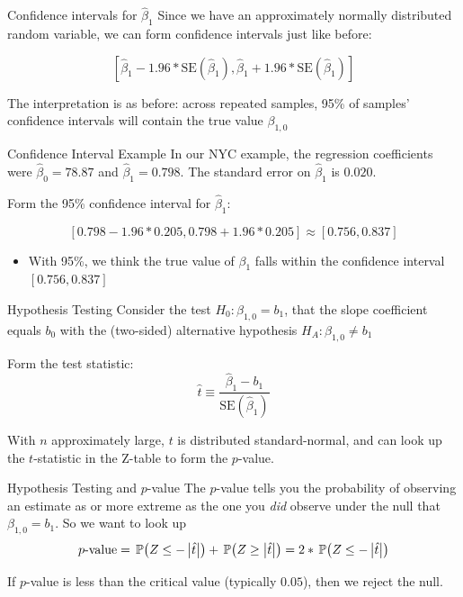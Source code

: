 \documentclass[aspectratio=169,t,11pt,table]{beamer}
\begin{document}
\begin{frame}{Confidence intervals for $\hat{\beta}_1$}
  Since we have an approximately normally distributed random variable, we can form confidence intervals just like before:

  $$
    \left[
      \hat{\beta}_1 - 1.96 * \text{SE}(\hat{\beta}_1), 
      \hat{\beta}_1 + 1.96 * \text{SE}(\hat{\beta}_1)
    \right]
  $$

  \pause
  \bigskip
  The interpretation is as before: across repeated samples, 95\% of samples' confidence intervals will contain the true value $\beta_{1, 0}$
\end{frame}

\begin{frame}{Confidence Interval Example}
  In our NYC example, the regression coefficients were $\hat{\beta}_0 = 78.87$ and $\hat{\beta}_1 = 0.798$. The standard error on $\hat{\beta}_1$ is $0.020$.

  \bigskip
  Form the 95\% confidence interval for $\hat{\beta}_1$:

  \pause
  $$
    \left[ 0.798 - 1.96 * 0.205, 0.798 + 1.96 * 0.205 \right] \approx
    \left[ 0.756, 0.837 \right]
  $$
  \begin{itemize}
    \item With 95\%, we think the true value of $\beta_1$ falls within the confidence interval $\left[ 0.756, 0.837 \right]$
  \end{itemize}
\end{frame}

\begin{frame}{Hypothesis Testing}
  Consider the test $H_0: \beta_{1, 0} = b_1$, that the slope coefficient equals $b_0$ with the (two-sided) alternative hypothesis $H_A: \beta_{1, 0} \neq b_1$

  \bigskip
  Form the \alert{test statistic}:
  $$
    \hat{t} \equiv \frac{\hat{\beta}_1 - b_1}{\text{SE}(\hat{\beta}_1)}
  $$

  With $n$ approximately large, $t$ is distributed standard-normal, and can look up the $t$-statistic in the Z-table to form the \alert{$p$-value}.
\end{frame}

\begin{frame}{Hypothesis Testing and $p$-value}
  The $p$-value tells you the probability of observing an estimate as or more extreme as the one you \emph{did} observe under the null that $\beta_{1, 0} = b_1$. So we want to look up 
  $$
    p\text{-value} = \prob{Z \leq - \abs{\hat{t}}} + \prob{Z \geq \abs{\hat{t}}} = 2 * \prob{Z \leq - \abs{\hat{t}}} 
  $$

  \pause
  \bigskip
  If $p$-value is less than the critical value (typically $0.05$), then we reject the null.
\end{frame}
\end{document}
